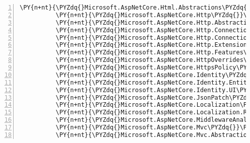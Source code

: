\begin{Verbatim}[commandchars=\\\{\},numbers=left,firstnumber=1,stepnumber=1,numberblanklines=0]
          \PY{n+nt}{\PYZdq{}Microsoft.AspNetCore.Html.Abstractions\PYZdq{}}\PY{p}{:} \PY{l+s+s2}{\PYZdq{}2.1.0\PYZhy{}rc1\PYZhy{}final\PYZdq{}}\PY{p}{,}
          \PY{n+nt}{\PYZdq{}Microsoft.AspNetCore.Http\PYZdq{}}\PY{p}{:} \PY{l+s+s2}{\PYZdq{}2.1.0\PYZhy{}rc1\PYZhy{}final\PYZdq{}}\PY{p}{,}
          \PY{n+nt}{\PYZdq{}Microsoft.AspNetCore.Http.Abstractions\PYZdq{}}\PY{p}{:} \PY{l+s+s2}{\PYZdq{}2.1.0\PYZhy{}rc1\PYZhy{}final\PYZdq{}}\PY{p}{,}
          \PY{n+nt}{\PYZdq{}Microsoft.AspNetCore.Http.Connections\PYZdq{}}\PY{p}{:} \PY{l+s+s2}{\PYZdq{}1.0.0\PYZhy{}rc1\PYZhy{}final\PYZdq{}}\PY{p}{,}
          \PY{n+nt}{\PYZdq{}Microsoft.AspNetCore.Http.Connections.Common\PYZdq{}}\PY{p}{:} \PY{l+s+s2}{\PYZdq{}1.0.0\PYZhy{}rc1\PYZhy{}final\PYZdq{}}\PY{p}{,}
          \PY{n+nt}{\PYZdq{}Microsoft.AspNetCore.Http.Extensions\PYZdq{}}\PY{p}{:} \PY{l+s+s2}{\PYZdq{}2.1.0\PYZhy{}rc1\PYZhy{}final\PYZdq{}}\PY{p}{,}
          \PY{n+nt}{\PYZdq{}Microsoft.AspNetCore.Http.Features\PYZdq{}}\PY{p}{:} \PY{l+s+s2}{\PYZdq{}2.1.0\PYZhy{}rc1\PYZhy{}final\PYZdq{}}\PY{p}{,}
          \PY{n+nt}{\PYZdq{}Microsoft.AspNetCore.HttpOverrides\PYZdq{}}\PY{p}{:} \PY{l+s+s2}{\PYZdq{}2.1.0\PYZhy{}rc1\PYZhy{}final\PYZdq{}}\PY{p}{,}
          \PY{n+nt}{\PYZdq{}Microsoft.AspNetCore.HttpsPolicy\PYZdq{}}\PY{p}{:} \PY{l+s+s2}{\PYZdq{}2.1.0\PYZhy{}rc1\PYZhy{}final\PYZdq{}}\PY{p}{,}
          \PY{n+nt}{\PYZdq{}Microsoft.AspNetCore.Identity\PYZdq{}}\PY{p}{:} \PY{l+s+s2}{\PYZdq{}2.1.0\PYZhy{}rc1\PYZhy{}final\PYZdq{}}\PY{p}{,}
          \PY{n+nt}{\PYZdq{}Microsoft.AspNetCore.Identity.EntityFrameworkCore\PYZdq{}}\PY{p}{:} \PY{l+s+s2}{\PYZdq{}2.1.0\PYZhy{}rc1\PYZhy{}final\PYZdq{}}\PY{p}{,}
          \PY{n+nt}{\PYZdq{}Microsoft.AspNetCore.Identity.UI\PYZdq{}}\PY{p}{:} \PY{l+s+s2}{\PYZdq{}2.1.0\PYZhy{}rc1\PYZhy{}final\PYZdq{}}\PY{p}{,}
          \PY{n+nt}{\PYZdq{}Microsoft.AspNetCore.JsonPatch\PYZdq{}}\PY{p}{:} \PY{l+s+s2}{\PYZdq{}2.1.0\PYZhy{}rc1\PYZhy{}final\PYZdq{}}\PY{p}{,}
          \PY{n+nt}{\PYZdq{}Microsoft.AspNetCore.Localization\PYZdq{}}\PY{p}{:} \PY{l+s+s2}{\PYZdq{}2.1.0\PYZhy{}rc1\PYZhy{}final\PYZdq{}}\PY{p}{,}
          \PY{n+nt}{\PYZdq{}Microsoft.AspNetCore.Localization.Routing\PYZdq{}}\PY{p}{:} \PY{l+s+s2}{\PYZdq{}2.1.0\PYZhy{}rc1\PYZhy{}final\PYZdq{}}\PY{p}{,}
          \PY{n+nt}{\PYZdq{}Microsoft.AspNetCore.MiddlewareAnalysis\PYZdq{}}\PY{p}{:} \PY{l+s+s2}{\PYZdq{}2.1.0\PYZhy{}rc1\PYZhy{}final\PYZdq{}}\PY{p}{,}
          \PY{n+nt}{\PYZdq{}Microsoft.AspNetCore.Mvc\PYZdq{}}\PY{p}{:} \PY{l+s+s2}{\PYZdq{}2.1.0\PYZhy{}rc1\PYZhy{}final\PYZdq{}}\PY{p}{,}
          \PY{n+nt}{\PYZdq{}Microsoft.AspNetCore.Mvc.Abstractions\PYZdq{}}\PY{p}{:} \PY{l+s+s2}{\PYZdq{}2.1.0\PYZhy{}rc1\PYZhy{}final\PYZdq{}}\PY{p}{,}

\end{Verbatim}
